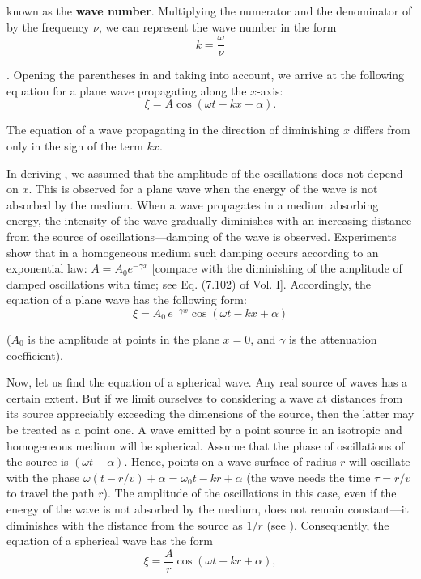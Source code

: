 \noindent
known as the \textbf{wave number}.
Multiplying the numerator and the denominator of  by the frequency $\nu$, we can represent the wave number in the form
\begin{equation}\label{eq:14_9}
    k = \frac{\omega}{\nu}
\end{equation}

.
Opening the parentheses in  and taking  into account, we arrive at the following equation for a plane wave propagating along the $x$-axis:
\begin{equation}\label{eq:14_10}
    \xi = A \cos(\omega t - kx + \alpha).
\end{equation}

\noindent
The equation of a wave propagating in the direction of diminishing $x$ differs from  only in the sign of the term $kx$.

In deriving , we assumed that the amplitude of the oscillations does not depend on $x$.
This is observed for a plane wave when the energy of the wave is not absorbed by the medium.
When a wave propagates in a medium absorbing energy, the intensity of the wave gradually diminishes with an increasing distance from the source of oscillations---damping of the wave is observed.
Experiments show that in a homogeneous medium such damping occurs according to an exponential law: $A = A_0 e^{-\gamma x}$ [compare with the diminishing of the amplitude of damped oscillations with time; see Eq. (7.102) of Vol. I].
Accordingly, the equation of a plane wave has the following form:
\begin{equation}\label{eq:14_11}
    \xi = A_0\, e^{-\gamma x} \cos(\omega t - kx + \alpha)
\end{equation}

\noindent
($A_0$ is the amplitude at points in the plane $x=0$, and $\gamma$ is the attenuation coefficient).

Now, let us find the equation of a spherical wave.
Any real source of waves has a certain extent.
But if we limit ourselves to considering a wave at distances from its source appreciably exceeding the dimensions of the source, then the latter may be treated as a point one.
A wave emitted by a point source in an isotropic and homogeneous medium will be spherical.
Assume that the phase of oscillations of the source is $(\omega t + \alpha)$.
Hence, points on a wave surface of radius $r$ will oscillate with the phase $\omega (t - r/v) + \alpha = \omega_0t - kr + \alpha$ (the wave needs the time $\tau = r/v$ to travel the path $r$).
The amplitude of the oscillations in this case, even if the energy of the wave is not absorbed by the medium, does not remain constant---it diminishes with the distance from the source as $1/r$ (see ).
Consequently, the equation of a spherical wave has the form
\begin{equation}\label{eq:14_12}
    \xi = \frac{A}{r} \cos(\omega t - kr + \alpha),
\end{equation}

